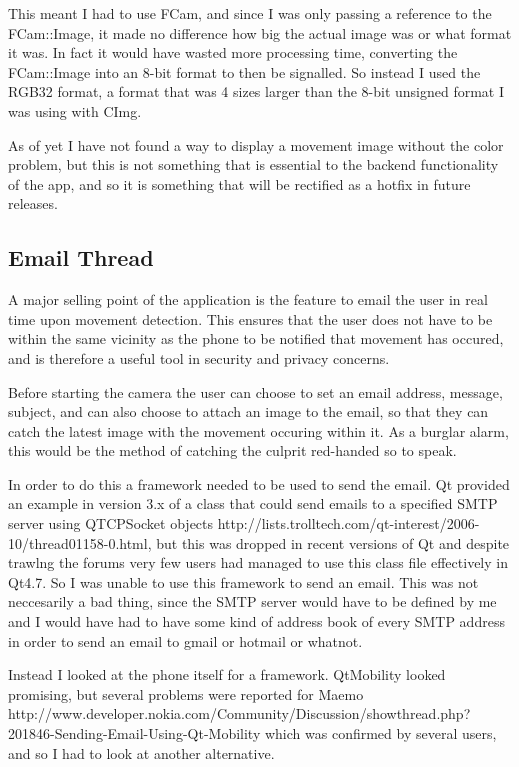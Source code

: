 \documentclass[11pt]{article} %
\begin{document}
This meant I had to use FCam, and since I was only passing a reference to the FCam::Image, it made no difference how big the actual image was or what format it was. In fact it would have wasted more processing time, converting the FCam::Image into an 8-bit format to then be signalled. So instead I used the RGB32 format, a format that was 4 sizes larger than the 8-bit unsigned format I was using with CImg. 

As of yet I have not found a way to display a movement image without the color problem, but this is not something that is essential to the backend functionality of the app, and so it is something that will be rectified as a hotfix in future releases.

\subsection{Email Thread}
A major selling point of the application is the feature to email the user in real time upon movement detection. This ensures that the user does not have to be within the same vicinity as the phone to be notified that movement has occured, and is therefore a useful tool in security and privacy concerns.

Before starting the camera the user can choose to set an email address, message, subject, and can also choose to attach an image to the email, so that they can catch the latest image with the movement occuring within it. As a burglar alarm, this would be the method of catching the culprit red-handed so to speak.

In order to do this a framework needed to be used to send the email.
Qt provided an example in version 3.x of a class that could send emails to a specified SMTP server using QTCPSocket objects http://lists.trolltech.com/qt-interest/2006-10/thread01158-0.html, but this was dropped in recent versions of Qt and despite trawlng the forums very few users had managed to use this class file effectively in Qt4.7. So I was unable to use this framework to send an email. This was not neccesarily a bad thing, since the SMTP server would have to be defined by me and I would have had to have some kind of address book of every SMTP address in order to send an email to gmail or hotmail or whatnot.

Instead I looked at the phone itself for a framework.  QtMobility looked promising, but several problems were reported for Maemo http://www.developer.nokia.com/Community/Discussion/showthread.php?201846-Sending-Email-Using-Qt-Mobility which was confirmed by several users, and so I had to look at another alternative.
\end{document}
